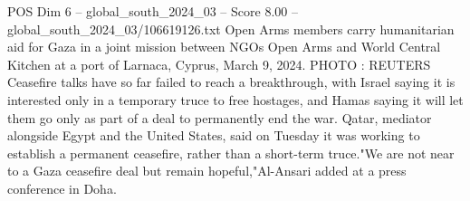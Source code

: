 \begin{textsample}{POS Dim 6 – global\_south\_2024\_03 – Score 8.00 – global\_south\_2024\_03/106619126.txt}
Open Arms members carry humanitarian aid for Gaza in a joint mission between NGOs Open Arms and World Central Kitchen at a port of Larnaca, Cyprus, March 9, 2024.
PHOTO : REUTERS Ceasefire talks have so far failed to reach a breakthrough, with Israel saying it is interested only in a temporary truce to free hostages, and Hamas saying it will let them go only as part of a deal to permanently end the war.
Qatar, mediator alongside Egypt and the United States, said on Tuesday it was working to establish a permanent ceasefire, rather than a short-term truce."We are not near to a Gaza ceasefire deal but remain hopeful,"Al-Ansari added at a press conference in Doha.

\end{textsample}
